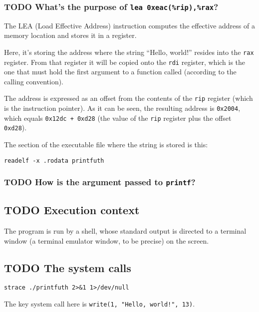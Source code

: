 \documentclass[11pt]{article}
\begin{document}
\subsubsection{{\bfseries\sffamily TODO} What's the purpose of \texttt{lea 0xeac(\%rip),\%rax}?}
\label{sec:org90e3094}

The LEA (Load Effective Address) instruction computes the effective address of a memory location and stores it in a register.

Here, it's storing the address where the string ``Hello, world!'' resides into the \texttt{rax} register. From that register it will be copied onto the \texttt{rdi} register, which is the one that must hold the first argument to a function called (according to the calling convention).

The address is expressed as an offset from the contents of the \texttt{rip} register (which is the instruction pointer). As it can be seen, the resulting address is \texttt{0x2004}, which equals \texttt{0x12dc + 0xd28} (the value of the \texttt{rip} register plus the offset \texttt{0xd28}).

The section of the executable file where the string is stored is this:

\begin{verbatim}
readelf -x .rodata printfuth
\end{verbatim}
\subsubsection{{\bfseries\sffamily TODO} How is the argument passed to \texttt{printf}?}
\label{sec:org176325c}
\subsection{{\bfseries\sffamily TODO} Execution context}
\label{sec:orga830c9c}

The program is run by a shell, whose standard output is directed to a terminal window (a terminal emulator window, to be precise) on the screen.
\subsection{{\bfseries\sffamily TODO} The system calls}
\label{sec:org2057da0}

\begin{verbatim}
strace ./printfuth 2>&1 1>/dev/null
\end{verbatim}

The key system call here is \texttt{write(1, "Hello, world!", 13)}.
\end{document}
